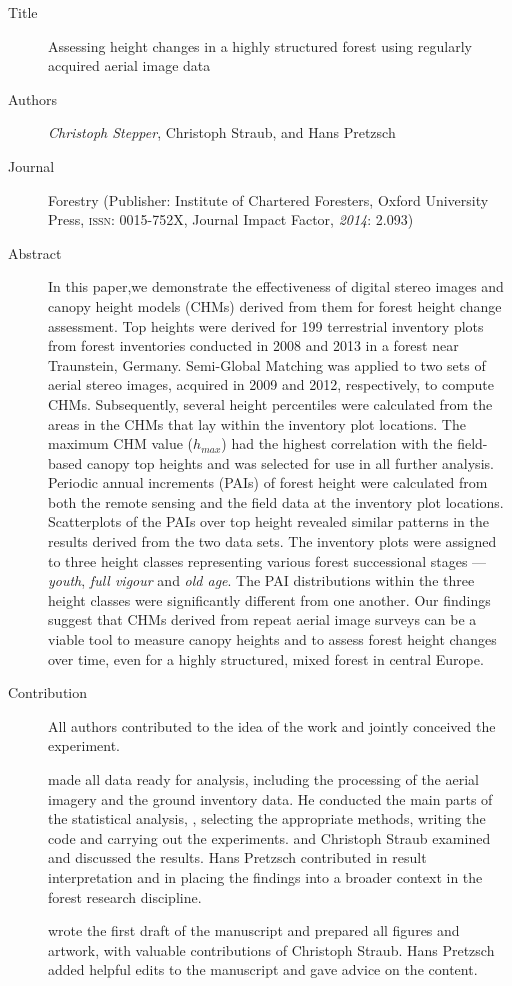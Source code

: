 \begin{description}
	\item[Title] Assessing height changes in a highly structured forest using regularly acquired aerial image data 
	\item[Authors] \emph{Christoph Stepper}, Christoph Straub, and Hans Pretzsch
	\item[Journal] Forestry (Publisher: Institute of Chartered Foresters, Oxford University Press, \textsc{issn}: 0015-752X, 
		Journal Impact Factor, \emph{2014}: 2.093)
	\item[Abstract] In this paper,we demonstrate the effectiveness of digital stereo images and canopy height models (CHMs) derived
		from them for forest height change assessment. Top heights were derived for 199 terrestrial inventory plots from
		forest inventories conducted in 2008 and 2013 in a forest near Traunstein, Germany. Semi-Global Matching was
		applied to two sets of aerial stereo images, acquired in 2009 and 2012, respectively, to compute CHMs. Subsequently,
		several height percentiles were calculated from the areas in the CHMs that lay within the inventory plot
		locations. The maximum CHM value ($h_{max}$) had the highest correlation with the field-based canopy top heights
		and was selected for use in all further analysis. Periodic annual increments (PAIs) of forest height were calculated
		from both the remote sensing and the field data at the inventory plot locations. Scatterplots of the PAIs over top
		height revealed similar patterns in the results derived from the two data sets. The inventory plots were assigned to
		three height classes representing various forest successional stages --- \emph{youth}, \emph{full vigour} and \emph{old age}.
		The PAI distributions
		within the three height classes were significantly different from one another. Our findings suggest
		that CHMs derived from repeat aerial image surveys can be a viable tool to measure canopy heights and to
		assess forest height changes over time, even for a highly structured, mixed forest in central Europe.
	\item[Contribution] All authors contributed to the idea of the work and jointly conceived the experiment.
	
		\myName made all data ready for analysis, including the processing of the aerial imagery and the ground inventory data. 
		He conducted the main parts of the statistical analysis, \ie, selecting the appropriate methods,
		writing the code and carrying out the experiments. \myName and Christoph Straub examined and discussed the results.
		Hans Pretzsch contributed in result interpretation and in placing the findings into a broader context in the forest research discipline.
	
		\myName wrote the first draft of the manuscript and prepared all figures and artwork, 
		with valuable contributions of Christoph Straub. 
		Hans Pretzsch added helpful edits to the manuscript and gave advice on the content. 
	
\end{description}

